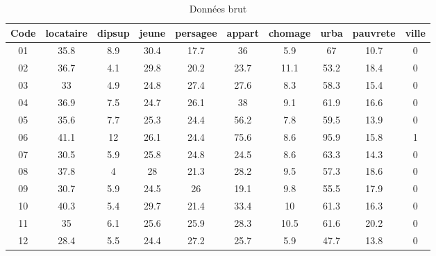 \begin{longtable} {|c|c|c|c|c|c|c|c|c|c|}
\caption{Données brut}
\toprule
Code                              &   locataire&      dipsup&       jeune&    persagee&      appart&     chomage&        urba&    pauvrete&       ville\\
\midrule
01                             &        35.8&         8.9&        30.4&        17.7&          36&         5.9&          67&        10.7&           0\\\hline
02                             &        36.7&         4.1&        29.8&        20.2&        23.7&        11.1&        53.2&        18.4&           0\\\hline
03                             &          33&         4.9&        24.8&        27.4&        27.6&         8.3&        58.3&        15.4&           0\\\hline
04                             &        36.9&         7.5&        24.7&        26.1&          38&         9.1&        61.9&        16.6&           0\\\hline
05                             &        35.6&         7.7&        25.3&        24.4&        56.2&         7.8&        59.5&        13.9&           0\\\hline
06                             &        41.1&          12&        26.1&        24.4&        75.6&         8.6&        95.9&        15.8&           1\\\hline
07                             &        30.5&         5.9&        25.8&        24.8&        24.5&         8.6&        63.3&        14.3&           0\\\hline
08                             &        37.8&           4&          28&        21.3&        28.2&         9.5&        57.3&        18.6&           0\\\hline
09                             &        30.7&         5.9&        24.5&          26&        19.1&         9.8&        55.5&        17.9&           0\\\hline
10                            &        40.3&         5.4&        29.7&        21.4&        33.4&          10&        61.3&        16.3&           0\\\hline
11                            &          35&         6.1&        25.6&        25.9&        28.3&        10.5&        61.6&        20.2&           0\\\hline
12                            &        28.4&         5.5&        24.4&        27.2&        25.7&         5.9&        47.7&        13.8&           0\\\hline

\end{longtable}
